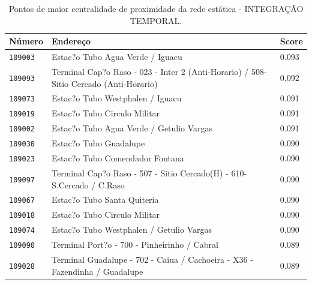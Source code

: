    
\begin{table}[htb]
    \caption{Pontos de maior centralidade de proximidade da rede estática - INTEGRAÇÃO TEMPORAL.}
    \label{tab:centralidade-proximidade-rede-estatica-integracao-temporal}
    \centering
    \footnotesize
    \begin{tabular}{p{1.0cm}p{9.0cm}p{3.0cm} } 
        \hline
        Número & Endereço & Score \\
        \hline
            \texttt{109003} &                                                            Estac?o Tubo Agua Verde / Iguacu &  0.093 \\
           \texttt{109093} &       Terminal Cap?o Raso - 023 - Inter 2 (Anti-Horario) / 508-Sitio Cercado (Anti-Horario)  &  0.092 \\
           \texttt{109073} &                                                            Estac?o Tubo Westphalen / Iguacu  &  0.091 \\
           \texttt{109019} &                                                                Estac?o Tubo Circulo Militar  &  0.091 \\
           \texttt{109002} &                                                    Estac?o Tubo Agua Verde / Getulio Vargas  &  0.091 \\
           \texttt{109030} &                                                                      Estac?o Tubo Guadalupe  &  0.090 \\
           \texttt{109023} &                                                             Estac?o Tubo Comendador Fontana  &  0.090 \\
           \texttt{109097} &                       Terminal Cap?o Raso - 507 - Sitio Cercado(H) - 610-S.Cercado / C.Raso  &  0.090 \\
           \texttt{109067} &                                                                 Estac?o Tubo Santa Quiteria  &  0.090 \\
           \texttt{109018} &                                                                Estac?o Tubo Circulo Militar  &  0.090 \\
           \texttt{109074} &                                                    Estac?o Tubo Westphalen / Getulio Vargas  &  0.090 \\
           \texttt{109090} &                                                Terminal Port?o - 700 - Pinheirinho / Cabral  &  0.089 \\
           \texttt{109028} &                 Terminal Guadalupe - 702 - Caiua / Cachoeira - X36 - Fazendinha / Guadalupe  &  0.089 \\

\end{tabular}
\end{table}
